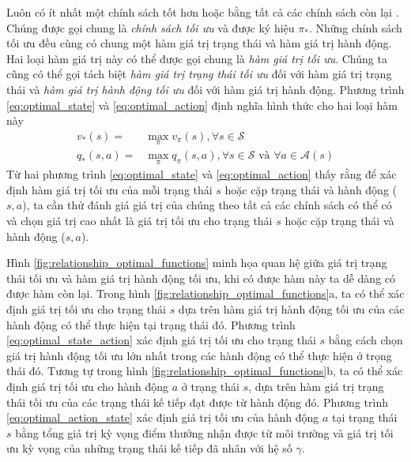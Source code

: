 Luôn có ít nhất một chính sách tốt hơn hoặc bằng tất cả các chính sách còn lại \cite{sutton1998introduction}. Chúng được gọi chung là \textit{chính sách tối ưu} và được ký hiệu $\pi_{*}$. Những chính sách tối ưu đều cùng có chung một hàm giá trị trạng thái và hàm giá trị hành động. Hai loại hàm giá trị này có thể được gọi chung là \textit{hàm giá trị tối ưu}. Chúng ta cũng có thể gọi tách biệt \textit{hàm giá trị trạng thái tối ưu} đối với hàm giá trị trạng thái và \textit{hàm giá trị hành động tối ưu} đối với hàm giá trị hành động. Phương trình \ref{eq:optimal_state} và \ref{eq:optimal_action} định nghĩa hình thức cho hai loại hàm này
\begin{align}
v_{*}(s) = {} & \max_{\pi}v_{\pi}(s), \forall s \in \mathcal{S} \label{eq:optimal_state} \\
q_{*}(s,a) = {} & \max_{\pi}q_{\pi}(s,a), \forall s \in \mathcal{S} \text{ và } \forall a \in \mathcal{A}(s) \label{eq:optimal_action}
\end{align}
Từ hai phương trình \ref{eq:optimal_state} và \ref{eq:optimal_action} thấy rằng để xác định hàm giá trị tối ưu của mỗi trạng thái $s$ hoặc cặp trạng thái và hành động ($s,a$), ta cần thử đánh giá giá trị của chúng theo tất cả các chính sách có thể có và chọn giá trị cao nhất là giá trị tối ưu cho trạng thái $s$ hoặc cặp trạng thái và hành động ($s,a$).

Hình \ref{fig:relationship_optimal_functions} minh họa quan hệ giữa giá trị trạng thái tối ưu và hàm giá trị hành động tối ưu, khi có được hàm này ta dễ dàng có được hàm còn lại. Trong hình \ref{fig:relationship_optimal_functions}a, ta có thể xác định giá trị tối ưu cho trạng thái $s$ dựa trên hàm giá trị hành động tối ưu của các hành động có thể thực hiện tại trạng thái đó. Phương trình \ref{eq:optimal_state_action} xác định giá trị tối ưu cho trạng thái $s$ bằng cách chọn giá trị hành động tối ưu lớn nhất trong các hành động có thể thực hiện ở trọng thái đó. Tương tự trong hình \ref{fig:relationship_optimal_functions}b, ta có thể xác định giá trị tối ưu cho hành động $a$ ở trạng thái $s$, dựa trên hàm giá trị trạng thái tối ưu của các trạng thái kế tiếp đạt được từ hành động đó. Phương trình \ref{eq:optimal_action_state} xác định giá trị tối ưu của hành động $a$ tại trạng thái $s$ bằng tổng giá trị kỳ vọng điểm thưởng nhận được từ môi trường và giá trị tối ưu kỳ vọng của những trạng thái kế tiếp đã nhân với hệ số $\gamma$.

